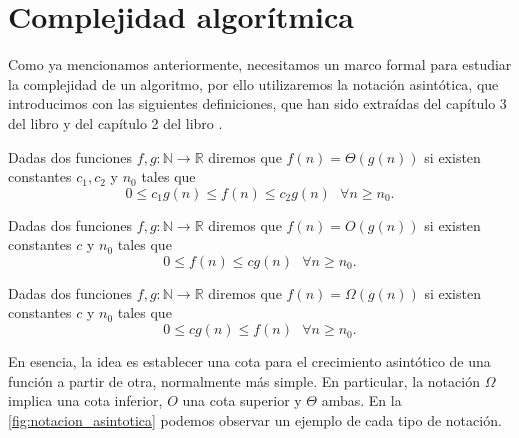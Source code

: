 
\chapter{Complejidad algorítmica}\label{ch:cuarto-capitulo}

Como ya mencionamos anteriormente, necesitamos un marco formal para estudiar la complejidad de un algoritmo, por ello utilizaremos la notación asintótica, que introducimos con las siguientes definiciones, que han sido extraídas del capítulo 3 del libro \cite{algorithms} y del capítulo 2 del libro \cite{alma991006265739704990}. 

\begin{definicion}
	Dadas dos funciones $f,g:\mathbb{N}\rightarrow \mathbb{R}$ diremos que $f(n)=\Theta(g(n))$ si existen constantes $c_1,c_2$ y $n_0$ tales que $$0\leq c_1g(n)\leq f(n)\leq c_2g(n)\ \ \ \forall n\geq n_0.$$
\end{definicion}

\begin{definicion}
	Dadas dos funciones $f,g:\mathbb{N}\rightarrow \mathbb{R}$ diremos que $f(n)=O(g(n))$ si existen constantes $c$ y $n_0$ tales que $$0\leq f(n)\leq cg(n)\ \ \ \forall n\geq n_0.$$
\end{definicion}

\begin{definicion}
	Dadas dos funciones $f,g:\mathbb{N}\rightarrow \mathbb{R}$ diremos que $f(n)=\Omega(g(n))$ si existen constantes $c$ y $n_0$ tales que $$0\leq cg(n)\leq f(n)\ \ \ \forall n\geq n_0.$$
\end{definicion}

En esencia, la idea es establecer una cota para el crecimiento asintótico de una función a partir de otra, normalmente más simple. En particular, la notación $\Omega$ implica una cota inferior, $O$ una cota superior y $\Theta$ ambas. En la \autoref{fig:notacion_asintotica} podemos observar un ejemplo de cada tipo de notación. \\

